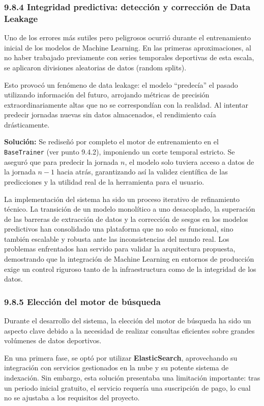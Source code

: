 \subsubsection{9.8.4 Integridad predictiva: detección y corrección de Data Leakage}
Uno de los errores más sutiles pero peligrosos ocurrió durante el entrenamiento inicial de los modelos de Machine Learning. En las primeras aproximaciones, al no haber trabajado previamente con series temporales deportivas de esta escala,
se aplicaron divisiones aleatorias de datos (random splits).
 
Esto provocó un fenómeno de data leakage: el modelo ``predecía'' el pasado utilizando información del futuro, arrojando métricas de precisión extraordinariamente altas que no se correspondían con la realidad. Al intentar
predecir jornadas nuevas sin datos almacenados, el rendimiento caía drásticamente.
 
\textbf{Solución:} Se rediseñó por completo el motor de entrenamiento en el \texttt{BaseTrainer} (ver punto 9.4.2), imponiendo un corte temporal estricto. Se aseguró que para predecir la jornada $n$, el modelo solo tuviera acceso a datos
de la jornada $n-1$ hacia atrás, garantizando así la validez científica de las predicciones y la utilidad real de la herramienta para el usuario.
 
La implementación del sistema ha sido un proceso iterativo de refinamiento técnico. La transición de un modelo monolítico a uno desacoplado, la superación de las barreras de extracción de datos y la corrección de sesgos en los modelos
predictivos han consolidado una plataforma que no solo es funcional, sino también escalable y robusta ante las inconsistencias del mundo real. Los problemas enfrentados han servido para validar la arquitectura propuesta, demostrando que la integración de Machine Learning en entornos de producción exige un control riguroso tanto de la infraestructura como de la integridad de los datos.
 
\subsubsection{9.8.5 Elección del motor de búsqueda}
 
Durante el desarrollo del sistema, la elección del motor de búsqueda ha sido un aspecto clave debido a la necesidad de realizar consultas eficientes sobre grandes volúmenes de datos deportivos.
 
En una primera fase, se optó por utilizar \textbf{ElasticSearch}, aprovechando su integración con servicios gestionados en la nube y su potente sistema de indexación. Sin embargo, esta solución presentaba una limitación importante: tras un periodo inicial gratuito, el servicio requería una suscripción de pago, lo cual no se ajustaba a los requisitos del proyecto.
 
